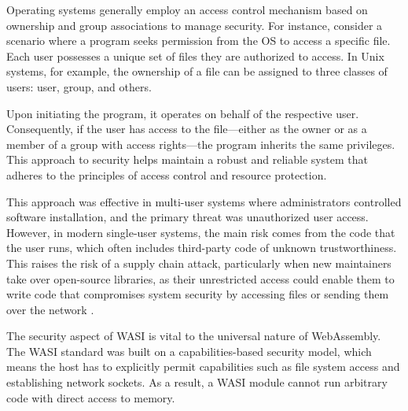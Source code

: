 Operating systems generally employ an access control mechanism based on ownership and group associations to manage security. For instance, consider a scenario where a program seeks permission from the OS to access a specific file. Each user possesses a unique set of files they are authorized to access. In Unix systems, for example, the ownership of a file can be assigned to three classes of users: user, group, and others.

Upon initiating the program, it operates on behalf of the respective user. Consequently, if the user has access to the file—either as the owner or as a member of a group with access rights—the program inherits the same privileges. This approach to security helps maintain a robust and reliable system that adheres to the principles of access control and resource protection.

This approach was effective in multi-user systems where administrators controlled software installation, and the primary threat was unauthorized user access. However, in modern single-user systems, the main risk comes from the code that the user runs, which often includes third-party code of unknown trustworthiness. This raises the risk of a supply chain attack, particularly when new maintainers take over open-source libraries, as their unrestricted access could enable them to write code that compromises system security by accessing files or sending them over the network \cite{clark_2019_standardising}.


The security aspect of WASI is vital to the universal nature of WebAssembly. The WASI standard was built on a capabilities-based security model, which means the host has to explicitly permit capabilities such as file system access and establishing network sockets. As a result, a WASI module cannot run arbitrary code with direct access to memory.


